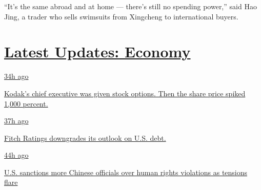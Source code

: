 ``It's the same abroad and at home --- there's still no spending
power,'' said Hao Jing, a trader who sells swimsuits from Xingcheng to
international buyers.

\hypertarget{latest-updates-economy}{%
\section{\texorpdfstring{\href{https://www.nytimes.com/live/2020/07/31/business/stock-market-today-coronavirus?action=click\&pgtype=Article\&state=default\&region=MAIN_CONTENT_1\&context=storylines_live_updates}{Latest
Updates:
Economy}}{Latest Updates: Economy}}\label{latest-updates-economy}}

\href{https://www.nytimes.com/live/2020/07/31/business/stock-market-today-coronavirus?action=click\&pgtype=Article\&state=default\&region=MAIN_CONTENT_1\&context=storylines_live_updates\#kodaks-chief-executive-was-given-stock-options-then-the-share-price-spiked-1000-percent}{34h
ago}

\href{https://www.nytimes.com/live/2020/07/31/business/stock-market-today-coronavirus?action=click\&pgtype=Article\&state=default\&region=MAIN_CONTENT_1\&context=storylines_live_updates\#kodaks-chief-executive-was-given-stock-options-then-the-share-price-spiked-1000-percent}{Kodak's
chief executive was given stock options. Then the share price spiked
1,000 percent.}

\href{https://www.nytimes.com/live/2020/07/31/business/stock-market-today-coronavirus?action=click\&pgtype=Article\&state=default\&region=MAIN_CONTENT_1\&context=storylines_live_updates\#fitch-ratings-downgrades-its-outlook-on-us-debt}{37h
ago}

\href{https://www.nytimes.com/live/2020/07/31/business/stock-market-today-coronavirus?action=click\&pgtype=Article\&state=default\&region=MAIN_CONTENT_1\&context=storylines_live_updates\#fitch-ratings-downgrades-its-outlook-on-us-debt}{Fitch
Ratings downgrades its outlook on U.S. debt.}

\href{https://www.nytimes.com/live/2020/07/31/business/stock-market-today-coronavirus?action=click\&pgtype=Article\&state=default\&region=MAIN_CONTENT_1\&context=storylines_live_updates\#us-sanctions-more-chinese-officials-over-human-rights-violations-as-tensions-flare}{44h
ago}

\href{https://www.nytimes.com/live/2020/07/31/business/stock-market-today-coronavirus?action=click\&pgtype=Article\&state=default\&region=MAIN_CONTENT_1\&context=storylines_live_updates\#us-sanctions-more-chinese-officials-over-human-rights-violations-as-tensions-flare}{U.S.
sanctions more Chinese officials over human rights violations as
tensions flare}

